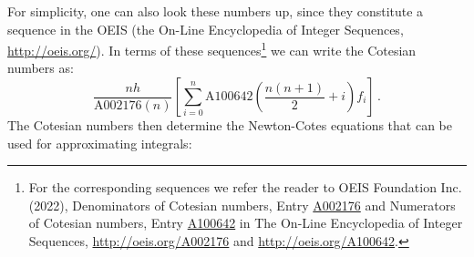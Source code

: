 For simplicity, one can also look these numbers up, since they constitute a sequence in the OEIS (the On-Line Encyclopedia of Integer Sequences, \url{http://oeis.org/}). In terms of these sequences\footnote{For the corresponding sequences we refer the reader to OEIS Foundation Inc. (2022), Denominators of Cotesian numbers, Entry \href{http://oeis.org/A002176}{A002176} and Numerators of Cotesian numbers, Entry \href{http://oeis.org/A100642}{A100642} in The On-Line Encyclopedia of Integer Sequences, \url{http://oeis.org/A002176} and \url{http://oeis.org/A100642}.} we can write the Cotesian numbers as:
\begin{equation}
    \frac{nh}{\textrm{A002176}(n)} \left[\sum_{i=0}^n \textrm{A100642}\left(\frac{n(n+1)}{2} + i\right)f_i \right] \,. \nonumber
\end{equation}
The Cotesian numbers then determine the Newton-Cotes equations that can be used for approximating integrals:
